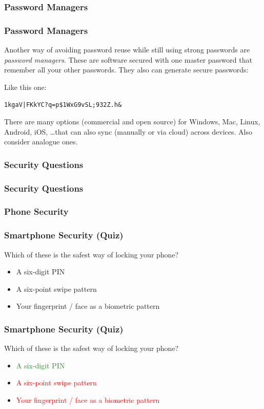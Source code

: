 \documentclass[aspectratio=169,dvipsnames]{beamer}
\begin{document}
\subsubsection{Password Managers}

\begin{frame}
\frametitle{Password Managers}
Another way of avoiding password reuse while still using strong passwords are \emph{password managers}. These are software secured with one master password that remember all your other passwords. They also can generate secure passwords:
\pause\bigskip

Like this one:
\begin{center}
\texttt{1kgaV|FKkYC?q=p\$1WxG9vSL;932Z.h\&}
\end{center}
\pause\bigskip

There are many options (commercial and open source) for Windows, Mac, Linux, Android, iOS, \dots that can also sync (manually or via cloud) across devices. Also consider analogue ones.
\end{frame}

\subsubsection{Security Questions}

\begin{frame}
\frametitle{Security Questions}
\end{frame}


\subsubsection{Phone Security}


\begin{frame}
\frametitle{Smartphone Security (Quiz)}

Which of these is the safest way of locking your phone?
\medskip

\begin{itemize}
\item A six-digit PIN
\item A six-point swipe pattern
\item Your fingerprint / face as a biometric pattern
\end{itemize}

\end{frame}

\begin{frame}
\frametitle{Smartphone Security (Quiz)}

Which of these is the safest way of locking your phone?
\medskip

\begin{itemize}
\item \textcolor{ForestGreen}{A six-digit PIN}
\item \textcolor{Red}{A six-point swipe pattern}
\item \textcolor{Red}{Your fingerprint / face as a biometric pattern}
\end{itemize}

\end{frame}
\end{document}

